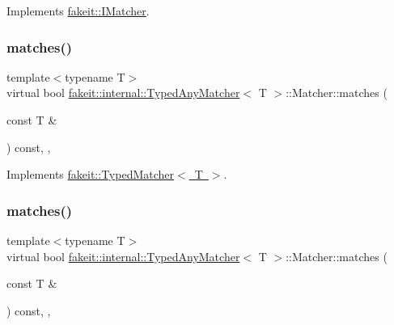 Implements \mbox{\hyperlink{structfakeit_1_1IMatcher_a409d414a042236dc5e05e241dfd24a67}{fakeit\+::\+I\+Matcher}}.

\mbox{\label{structfakeit_1_1internal_1_1TypedAnyMatcher_1_1Matcher_a7a4fb0a098671bd53dd9403169734649}} 
\subsubsection{\texorpdfstring{matches()}{matches()}\hspace{0.1cm}{\footnotesize\ttfamily [1/9]}}
{\footnotesize\ttfamily template$<$typename T$>$ \\
virtual bool \mbox{\hyperlink{structfakeit_1_1internal_1_1TypedAnyMatcher}{fakeit\+::internal\+::\+Typed\+Any\+Matcher}}$<$ T $>$\+::Matcher\+::matches (\begin{DoxyParamCaption}\item[{const T \&}]{ }\end{DoxyParamCaption}) const\hspace{0.3cm}{\ttfamily [inline]}, {\ttfamily [override]}, {\ttfamily [virtual]}}



Implements \mbox{\hyperlink{structfakeit_1_1TypedMatcher_ac553bb6ac7c98a489c92fa6ace0f2e2b}{fakeit\+::\+Typed\+Matcher$<$ T $>$}}.

\mbox{\label{structfakeit_1_1internal_1_1TypedAnyMatcher_1_1Matcher_a7a4fb0a098671bd53dd9403169734649}} 
\subsubsection{\texorpdfstring{matches()}{matches()}\hspace{0.1cm}{\footnotesize\ttfamily [2/9]}}
{\footnotesize\ttfamily template$<$typename T$>$ \\
virtual bool \mbox{\hyperlink{structfakeit_1_1internal_1_1TypedAnyMatcher}{fakeit\+::internal\+::\+Typed\+Any\+Matcher}}$<$ T $>$\+::Matcher\+::matches (\begin{DoxyParamCaption}\item[{const T \&}]{ }\end{DoxyParamCaption}) const\hspace{0.3cm}{\ttfamily [inline]}, {\ttfamily [override]}, {\ttfamily [virtual]}}



